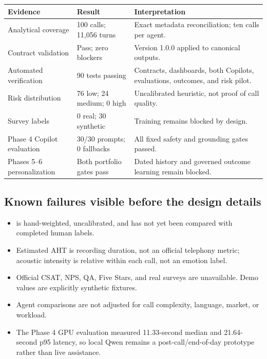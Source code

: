 \documentclass[11pt,letterpaper]{article}
\newenvironment{compactitem}{\begin{itemize}\setlength{\itemsep}{2pt}\setlength{\parskip}{0pt}\setlength{\topsep}{3pt}}{\end{itemize}}
\begin{document}
\begin{center}\small
\begin{tabular}{p{}p{}p{}}
\toprule
Evidence & Result & Interpretation \\
\midrule
Analytical coverage & 100 calls; 11,056 turns & Exact metadata reconciliation; ten calls per agent. \\
Contract validation & Pass; zero blockers & Version 1.0.0 applied to canonical outputs. \\
Automated verification & 90 tests passing & Contracts, dashboards, both Copilots, evaluations, outcomes, and risk pilot. \\
Risk distribution & 76 low; 24 medium; 0 high & Uncalibrated heuristic, not proof of call quality. \\
Survey labels & 0 real; 30 synthetic & Training remains blocked by design. \\
Phase 4 Copilot evaluation & 30/30 prompts; 0 fallbacks & All fixed safety and grounding gates passed. \\
Phases 5--6 personalization & Both portfolio gates pass & Dated history and governed outcome learning remain blocked. \\
\bottomrule
\end{tabular}
\end{center}

\subsection*{Known failures visible before the design details}

\begin{compactitem}
  \item {} is hand-weighted, uncalibrated, and has not yet
  been compared with completed human labels.
  \item Estimated AHT is recording duration, not an official telephony metric;
  acoustic intensity is relative within each call, not an emotion label.
  \item Official CSAT, NPS, QA, Five Stars, and real surveys are unavailable. Demo
  values are explicitly synthetic fixtures.
  \item Agent comparisons are not adjusted for call complexity, language, market,
  or workload.
  \item The Phase 4 GPU evaluation measured 11.33-second median and 21.64-second
  p95 latency, so local Qwen remains a post-call/end-of-day prototype rather
  than live assistance.
\end{compactitem}
\end{document}
